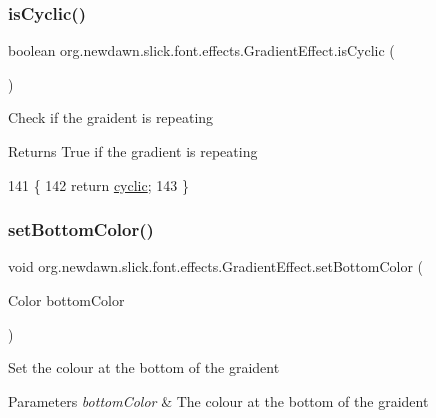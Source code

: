 \subsubsection{\texorpdfstring{is\+Cyclic()}{isCyclic()}}
{\footnotesize\ttfamily boolean org.\+newdawn.\+slick.\+font.\+effects.\+Gradient\+Effect.\+is\+Cyclic (\begin{DoxyParamCaption}{ }\end{DoxyParamCaption})\hspace{0.3cm}{\ttfamily [inline]}}

Check if the graident is repeating

\begin{DoxyReturn}{Returns}
True if the gradient is repeating 
\end{DoxyReturn}

\begin{DoxyCode}
141                               \{
142         \textcolor{keywordflow}{return} \mbox{\hyperlink{classorg_1_1newdawn_1_1slick_1_1font_1_1effects_1_1_gradient_effect_acbd7560addc0833e17851d5008dfbf18}{cyclic}};
143     \}
\end{DoxyCode}
\mbox{\label{classorg_1_1newdawn_1_1slick_1_1font_1_1effects_1_1_gradient_effect_a85d228fa2711d385fd5b571b10a32231}} 
\subsubsection{\texorpdfstring{set\+Bottom\+Color()}{setBottomColor()}}
{\footnotesize\ttfamily void org.\+newdawn.\+slick.\+font.\+effects.\+Gradient\+Effect.\+set\+Bottom\+Color (\begin{DoxyParamCaption}\item[{Color}]{bottom\+Color }\end{DoxyParamCaption})\hspace{0.3cm}{\ttfamily [inline]}}

Set the colour at the bottom of the graident


\begin{DoxyParams}{Parameters}
{\em bottom\+Color} & The colour at the bottom of the graident \\
\hline
\end{DoxyParams}

